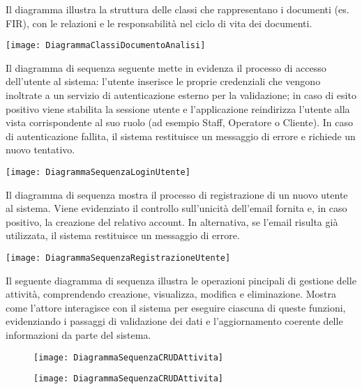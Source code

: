 \documentclass[a4paper]{report}
\begin{document}
\clearpage
{}
Il diagramma illustra la struttura delle classi che rappresentano i documenti (es. FIR), con le relazioni e le responsabilità nel ciclo di vita dei documenti.

\begin{figure*}[!ht]
    \centering
    \texttt{[image: DiagrammaClassiDocumentoAnalisi]}
\end{figure*}

\clearpage
{}

\noindent
Il diagramma di sequenza seguente mette in evidenza il processo di accesso dell'utente al sistema: l'utente inserisce le proprie credenziali che vengono inoltrate a un servizio di autenticazione esterno per la validazione; in caso di esito positivo viene stabilita la sessione utente e l'applicazione reindirizza l'utente alla vista corrispondente al suo ruolo (ad esempio Staff, Operatore o Cliente). In caso di autenticazione fallita, il sistema restituisce un messaggio di errore e richiede un nuovo tentativo.

\begin{figure*}[!ht]
    \centering
    \texttt{[image: DiagrammaSequenzaLoginUtente]}
\end{figure*}

\clearpage
{}
\noindent
Il diagramma di sequenza mostra il processo di registrazione di un nuovo utente al sistema. Viene evidenziato il controllo sull’unicità dell’email fornita e, in caso positivo, la creazione del relativo account. In alternativa, se l’email risulta già utilizzata, il sistema restituisce un messaggio di errore.

\begin{figure*}[!ht]
    \centering
    \texttt{[image: DiagrammaSequenzaRegistrazioneUtente]}
\end{figure*}

\clearpage
{}
\noindent
Il seguente diagramma di sequenza illustra le operazioni pincipali di gestione delle attività, comprendendo creazione, visualizza, modifica e eliminazione.
Mostra come l’attore interagisce con il sistema per eseguire ciascuna di queste funzioni, evidenziando i passaggi di validazione dei dati e l’aggiornamento coerente delle informazioni da parte del sistema.

\begin{figure}[!ht]
  \centering
  \texttt{[image: DiagrammaSequenzaCRUDAttivita]}
\end{figure}
\clearpage
\begin{figure}[!ht]
  \centering
  \texttt{[image: DiagrammaSequenzaCRUDAttivita]}
\end{figure}
\end{document}
